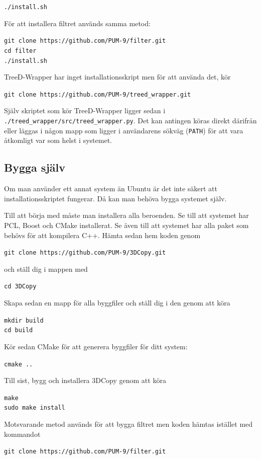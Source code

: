 \documentclass[a4paper,titlepage,12pt]{article}
\begin{document}
	\texttt{./install.sh}
	
	För att installera filtret används samma metod:
	
	\texttt{git clone https://github.com/PUM-9/filter.git \\
	cd filter \\
	./install.sh}
	
	TreeD-Wrapper har inget installationsskript men för att använda det, kör
	
	\texttt{git clone https://github.com/PUM-9/treed\_wrapper.git}
	
	Själv skriptet som kör TreeD-Wrapper ligger sedan i \texttt{./treed\_wrapper/src/treed\_wrapper.py}. Det kan antingen köras direkt därifrån eller läggas i någon mapp som ligger i användarens sökväg (\texttt{PATH}) för att vara åtkomligt var som helst i systemet.
	
\subsection{Bygga själv}
	Om man använder ett annat system än Ubuntu är det inte säkert att installationsskriptet fungerar. Då kan man behöva bygga systemet själv.
	
	Till att börja med måste man installera alla beroenden. Se till att systemet har PCL, Boost och CMake installerat. Se även till att systemet har alla paket som behövs för att kompilera C++. Hämta sedan hem koden genom
	
	\texttt{git clone https://github.com/PUM-9/3DCopy.git}
	
	och ställ dig i mappen med
	
	\texttt{cd 3DCopy}
	
	Skapa sedan en mapp för alla byggfiler och ställ dig i den genom att köra
	
	\texttt{mkdir build \\
	cd build}
	
	Kör sedan CMake för att generera byggfiler för ditt system:
	
	\texttt{cmake ..}
	
	Till sist, bygg och installera 3DCopy genom att köra
	
	\texttt{make \\
	sudo make install}

	Motsvarande metod används för att bygga filtret men koden hämtas istället med kommandot
	
	\texttt{git clone https://github.com/PUM-9/filter.git}
\newpage
\end{document}
